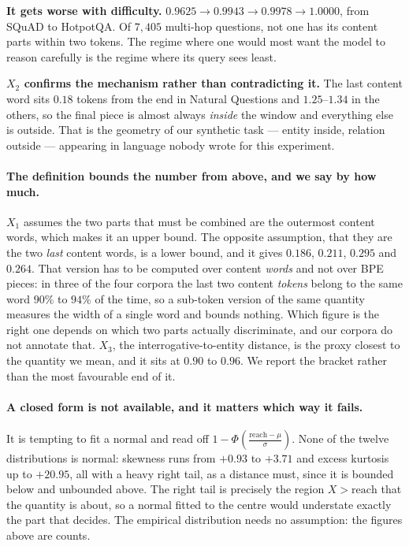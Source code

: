 \documentclass[11pt,a4paper]{article}
\begin{document}
\textbf{It gets worse with difficulty.} $0.9625 \to 0.9943 \to 0.9978 \to 1.0000$, from SQuAD to
HotpotQA. Of $7{,}405$ multi-hop questions, not one has its content parts within two tokens. The
regime where one would most want the model to reason carefully is the regime where its query sees
least.

\textbf{$X_2$ confirms the mechanism rather than contradicting it.} The last content word sits
$0.18$ tokens from the end in Natural Questions and $1.25$--$1.34$ in the others, so the final piece
is almost always \emph{inside} the window and everything else is outside. That is the geometry of our
synthetic task --- entity inside, relation outside --- appearing in language nobody wrote for this
experiment.

\paragraph{The definition bounds the number from above, and we say by how much.} $X_1$ assumes the
two parts that must be combined are the outermost content words, which makes it an upper bound. The
opposite assumption, that they are the two \emph{last} content words, is a lower bound, and it gives
$0.186$, $0.211$, $0.295$ and $0.264$. That version has to be computed over content \emph{words} and
not over BPE pieces: in three of the four corpora the last two content \emph{tokens} belong to the
same word $90\%$ to $94\%$ of the time, so a sub-token version of the same quantity measures the width
of a single word and bounds nothing. Which figure is the right one depends on which two parts actually
discriminate, and our corpora do not annotate that. $X_3$, the interrogative-to-entity distance, is
the proxy closest to the quantity we mean, and it sits at $0.90$ to $0.96$. We report the bracket
rather than the most favourable end of it.

\paragraph{A closed form is not available, and it matters which way it fails.} It is tempting to fit
a normal and read off $1 - \Phi\!\left(\frac{\text{reach}-\mu}{\sigma}\right)$. None of the twelve
distributions is normal: skewness runs from $+0.93$ to $+3.71$ and excess kurtosis up to $+20.95$,
all with a heavy right tail, as a distance must, since it is bounded below and unbounded above. The
right tail is precisely the region $X > \text{reach}$ that the quantity is about, so a normal fitted
to the centre would understate exactly the part that decides. The empirical distribution needs no
assumption: the figures above are counts.
\end{document}
